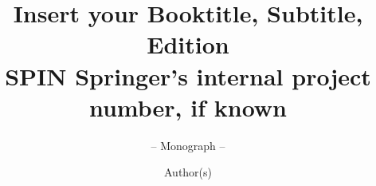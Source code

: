 \documentclass[envcountsame,envcountchap]{svmono}
\begin{document}
\author{Author(s)}
\title{Insert your Booktitle, Subtitle, Edition\\
{\small SPIN Springer's internal project number, if known}}
\subtitle{-- Monograph --}
\maketitle

\frontmatter%




\tableofcontents


\mainmatter%


%
%




\backmatter%


\printindex

\end{document}
